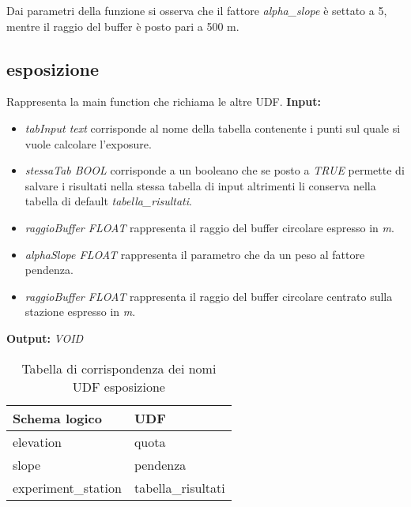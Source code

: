 Dai parametri della funzione si osserva che il fattore \textit{alpha\_slope} è settato a 5, mentre il raggio del buffer è posto pari a 500 m.

\subsection{esposizione}
Rappresenta la main function che richiama le altre UDF.
\textbf{Input:}
\begin{itemize}
\item \textit{tabInput text} corrisponde al nome della tabella contenente i punti sul quale si vuole calcolare l'exposure. 
\item \textit{stessaTab BOOL} corrisponde a un booleano che se posto a \textit{TRUE} permette di salvare i risultati nella stessa tabella di input altrimenti li conserva nella tabella di default \textit{tabella\_risultati}. 
\item \textit{raggioBuffer FLOAT} rappresenta il raggio del buffer circolare espresso in \textit{m}.
\item \textit{alphaSlope FLOAT} rappresenta il parametro che da un peso al fattore pendenza.
\item \textit{raggioBuffer FLOAT } rappresenta il raggio del buffer circolare centrato sulla stazione espresso in \textit{m}.
\end{itemize}
\textbf{Output:} \textit{VOID} 

\begin{table}[h]
\centering
\caption{Tabella di corrispondenza dei nomi UDF esposizione}
\label{mapTb3}
\begin{tabular}{|l|l|}
\hline
Schema logico       & UDF                \\ \hline
elevation           & quota              \\
slope               & pendenza           \\
experiment\_station & tabella\_risultati \\ \hline
\end{tabular}
\end{table}

